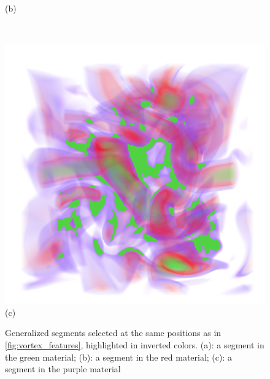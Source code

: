 \documentclass[twoside,twocolumn,10pt]{article}
\begin{document}
\begin{figure}
\begin{minipage}{.16\textwidth}
		(b)
	\end{minipage}~
	\begin{minipage}{.16\textwidth}
		\centering
		\includegraphics[width=1\linewidth]{crop/vortex_segment_purple}
		(c)
	\end{minipage}
	\caption{Generalized segments selected at the same positions as in \autoref{fig:vortex_features}, highlighted in inverted colors. (a): a segment in the green material; (b): a segment in the red material; (c): a segment in the purple material}
	\label{fig:vortex_segments}
\end{figure}
\end{document}
